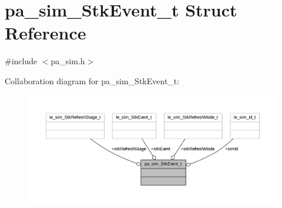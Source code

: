 \hypertarget{structpa__sim___stk_event__t}{}\section{pa\+\_\+sim\+\_\+\+Stk\+Event\+\_\+t Struct Reference}
\label{structpa__sim___stk_event__t}


{\ttfamily \#include $<$pa\+\_\+sim.\+h$>$}



Collaboration diagram for pa\+\_\+sim\+\_\+\+Stk\+Event\+\_\+t\+:
\nopagebreak
\begin{figure}[H]
\begin{center}
\leavevmode
\includegraphics[width=350pt]{structpa__sim___stk_event__t__coll__graph}
\end{center}
\end{figure}
